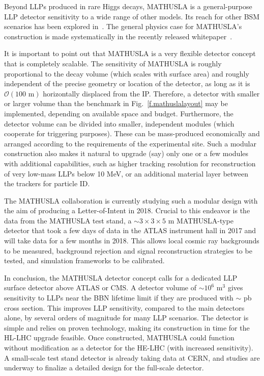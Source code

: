 Beyond LLPs produced in rare Higgs decays, MATHUSLA is a general-purpose LLP detector sensitivity to a wide range of other models. Its reach for other BSM scenarios has been explored in~\cite{Co:2016fln, Dev:2016vle, Dev:2017dui, Caputo:2017pit, Evans:2017lvd, Evans:2017kti, Helo:2018qej, DAgnolo:2018wcn, Deppisch:2018eth, Jana:2018rdf}. The general physics case for MATHUSLA's construction is  made systematically in the recently released whitepaper~\cite{Curtin:2018mvb}.


It is important to point out that MATHUSLA is a very flexible detector concept that is completely scalable. 
%
The sensitivity of MATHUSLA is roughly proportional to the decay volume (which scales with surface area) and roughly independent of the precise geometry or location of the detector, as long as it is $\mathcal{O}(100 \,\,\mathrm{m})$ horizontally displaced from the IP. 
%
Therefore, a detector with smaller or larger volume than the benchmark in Fig.~\ref{f.mathuslalayout} may be implemented, depending on available space and budget. 
%
Furthermore, the detector volume can be divided into smaller, independent modules (which cooperate for triggering purposes). These can be mass-produced economically and arranged according to the requirements of the experimental site. 
%
Such a modular construction also makes it natural to upgrade (say) only one or a few modules with additional capabilities, such as higher tracking resolution for reconstruction of very low-mass LLPs below 10 MeV, or an additional material layer between the trackers for particle ID.


The MATHUSLA collaboration is currently studying such a modular design with the aim of producing a Letter-of-Intent in 2018. Crucial to this endeavor is the data from the MATHUSLA test stand, a $\sim 3 \times 3 \times 5$ m MATHUSLA-type detector that took a few days of data in the ATLAS instrument hall in 2017 and will take data for a few months in 2018. This allows local cosmic ray backgrounds to be measured, background rejection and signal reconstruction strategies to be tested, and simulation frameworks to be calibrated. 


In conclusion, the MATHUSLA detector concept calls for a dedicated LLP surface detector above ATLAS or CMS. 
%
A detector volume of $\sim 10^6\,\,\mathrm{m}^3$ gives sensitivity to LLPs near the BBN lifetime limit if they are produced with $\sim$ pb cross section. This improves LLP sensitivity, compared to the main detectors alone, by several orders of magnitude for many LLP scenarios.
%
 The detector is simple and relies on proven technology, making its construction in time for the HL-LHC upgrade feasible. Once constructed, MATHUSLA could function without modification as a detector for the HE-LHC (with increased sensitivity).
 A small-scale test stand detector is already taking data at CERN, and studies are underway to finalize a detailed design for the full-scale detector.

